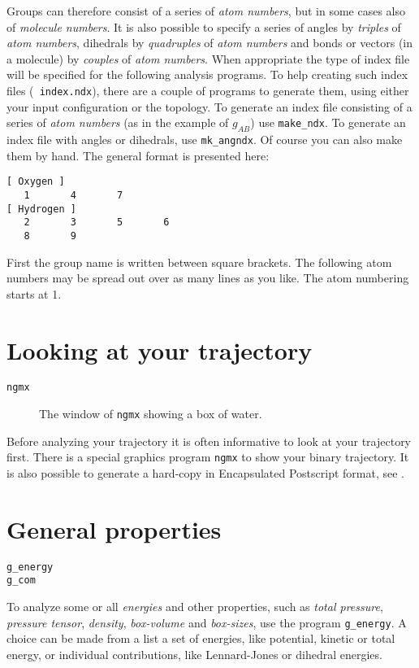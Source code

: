 Groups can therefore consist of a series of {\em atom numbers}, but in
some cases also of {\em molecule numbers}.  It is also possible to
specify a series of angles by {\em triples} of {\em atom numbers},
dihedrals by {\em quadruples} of {\em atom numbers} and bonds or
vectors (in a molecule) by {\em couples} of {\em atom numbers}. When
appropriate the type of index file will be specified for the following
analysis programs.  To help creating such index files ({\tt
index.ndx}), there are a couple of programs to generate them, using
either your input configuration or the topology.  To generate an
index file consisting of a series of {\em atom numbers} (as in the
example of $g_{AB}$) use {\tt make\_ndx}. To generate an index file
with angles or dihedrals, use {\tt mk\_angndx}. Of course you can also
make them by hand. The general format is presented here:
{\samepage
\begin{verbatim}
[ Oxygen ]
   1       4       7 
[ Hydrogen ]
   2       3       5       6
   8       9
\end{verbatim}}

First the group name is written between square brackets.
The following atom numbers may be spread out over as many lines as you like.
The atom numbering starts at 1. 

\section{Looking at your trajectory}
\label{sec:lookwhostalking}
\begin{verbatim}
ngmx
\end{verbatim}

\begin{figure}
\centerline{
{}}
\caption{The window of {\tt ngmx} showing a box of water.}
\label{fig:ngmxdump}
\end{figure}

Before analyzing your trajectory it is often informative to look at
your trajectory first. There is a special graphics program {\tt ngmx}
to show your binary trajectory. It is also possible to generate a
hard-copy in Encapsulated Postscript format, see
.


\section{General properties}
\label{sec:genprop}
\begin{verbatim}
g_energy
g_com
\end{verbatim}
To analyze some or all {\em energies} and other properties, such as
{\em total pressure}, {\em pressure tensor}, {\em density}, {\em
box-volume} and {\em box-sizes}, use the program {\tt g\_energy}.  A
choice can be made from a list a set of energies, like potential,
kinetic or total energy, or individual contributions, like
Lennard-Jones or dihedral energies.

